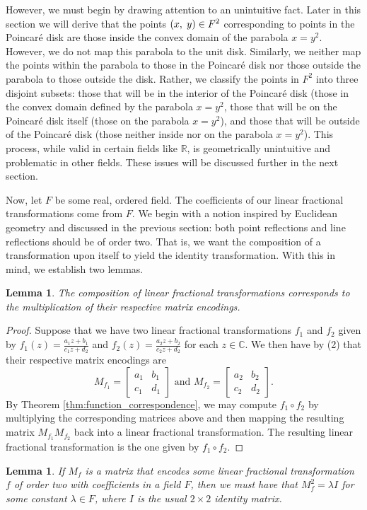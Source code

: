 \documentclass[12pt]{article}
\newcommand{\R}{\mathbb{R}}
\newcommand{\C}{\mathbb{C}}
\newcommand{\lftmat}[4]{\begin{bmatrix} {#1} & {#2} \\ {#3} & {#4} \end{bmatrix}}
\newcommand{\ttc}{, \hspace{1mm}}
\newcommand{\poincare}{Poincar\'{e} }
\theoremstyle{plain}
\newtheorem{lemma}[theorem]{Lemma}
\theoremstyle{definition}
\begin{document}
However, we must begin by drawing attention to an unintuitive fact. Later in this section we will derive that the points $(x\ttc y) \in F^2$ corresponding to points in the \poincare disk are those inside the convex domain of the parabola $x = y^2$. However, we do not map this parabola to the unit disk. Similarly, we neither map the points within the parabola to those in the \poincare disk nor those outside the parabola to those outside the disk. Rather, we classify the points in $F^2$ into three disjoint subsets: those that will be in the interior of the \poincare disk (those in the convex domain defined by the parabola $x = y^2$, those that will be on the \poincare disk itself (those on the parabola $x = y^2$), and those that will be outside of the \poincare disk (those neither inside nor on the parabola $x = y^2$). This process, while valid in certain fields like $\R$, is geometrically unintuitive and problematic in other fields. These issues will be discussed further in the next section. 

Now, let $F$ be some real, ordered field. The coefficients of our linear fractional transformations come from $F$. We begin with a notion inspired by Euclidean geometry and discussed in the previous section: both point reflections and line reflections should be of order two. That is, we want the composition of a transformation upon itself to yield the identity transformation. With this in mind, we establish two lemmas.

\begin{lemma} 
	The composition of linear fractional transformations corresponds to the multiplication of their respective matrix encodings.
\end{lemma}

\begin{proof} 
	Suppose that we have two linear fractional transformations $f_1$ and $f_2$ given by $f_1(z) = \frac{a_1z+b_1}{c_1z+d_2}$ and $f_2(z) = \frac{a_2z+b_2}{c_2z+d_2}$ for each $z \in \C$. We then have by (2) that their respective matrix encodings are 
\[ 
	M_{f_1} = \lftmat{a_1}{b_1}{c_1}{d_1} 
	\text{ and } 
	M_{f_2} =  \lftmat{a_2}{b_2}{c_2}{d_2}. 
\] 
	By Theorem \ref{thm:function_correspondence}, we may compute $f_1\circ f_2$ by multiplying the corresponding matrices above and then mapping the resulting matrix $M_{f_1}M_{f_2}$ back into a linear fractional transformation. The resulting linear fractional transformation is the one given by $f_1\circ f_2$.
\end{proof}	
	
\begin{lemma}
	If $M_f$ is a matrix that encodes some linear fractional transformation $f$ of order two with coefficients in a field $F$, then we must have that $M_f^2 = \lambda I$ for some constant $\lambda \in F$, where $I$ is the usual $2 \times 2$ identity matrix. 
\end{lemma}
\end{document}
